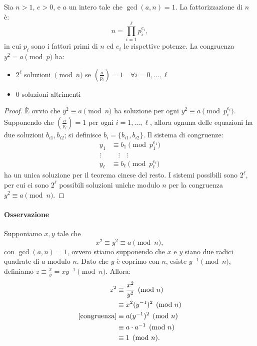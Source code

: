 \begin{theorem}
    \label{thm:4}
    Sia $n>1$, $e>0$, e $a$ un intero tale che $\gcd(a,n) = 1$. La fattorizzazione di $n$ è:
    \[
        n = \prod_{i=1}^{\ell} p_i^{e_i},
    \]
    in cui $p_i$ sono i fattori primi di $n$ ed $e_i$ le rispettive potenze. La congruenza $y^2 = a \pmod {p}$ ha:
    \begin{itemize}
        \item $2^{\ell}$ soluzioni $\pmod n$ se $\left( \frac{a}{p_i}\right) = 1 \quad \forall i=0,\dots,\ell$
        \item 0 soluzioni altrimenti
    \end{itemize}

\end{theorem}
\begin{proof}
    È ovvio che $y^2 \equiv a \pmod n$ ha soluzione per ogni $y^2 \equiv a \pmod {p_i^{e_i}}$. Supponendo che $\left(\frac{a}{p_i}\right) = 1$ per ogni $i = 1,\dots, \ell$, allora ognuna delle equazioni ha due soluzioni $b_{i1}, b_{i2}$; si definisce $b_i=\{b_{i1},b_{i2}\}$. Il sistema di congruenze:
    \begin{align*}
        {y_1} &\equiv b_1 \pmod {p_1^{e_1}}\\
        \vdots &\quad \vdots \quad \vdots\\
        {y_\ell} &\equiv b_\ell \pmod {p_\ell^{e_\ell}}
    \end{align*}
    ha un unica soluzione per il teorema cinese del resto. I sistemi possibili sono $2^{\ell}$, per cui ci sono $2^\ell$ possibili soluzioni uniche modulo $n$ per la congruenza $y^2 \equiv a \pmod n$.
    
\end{proof}

\paragraph{Osservazione} Supponiamo $x,y$ tale che
\begin{equation}
    \label{congruenza}
    x^2 \equiv y^2 \equiv a \pmod n,
\end{equation}
con $\gcd(a,n)=1$, ovvero stiamo supponendo che $x$ e $y$ siano due radici quadrate di $a$ modulo $n$. 
\noindent Dato che $y$ è coprimo con $n$, esiste $y^{-1} \pmod n$, definiamo $z \equiv \frac{x}{y} = xy^{-1} \pmod n$. Allora:
\[ 
\begin{aligned}
    z^2 &\equiv \frac{x^2}{y^2} \pmod n \\ 
    &\equiv x^2(y^{-1})^2 \pmod n   \\ 
    \substack{\ref{congruenza}} &\equiv a(y^{-1})^2 \pmod n \\  
    &\equiv a \cdot a^{-1} \pmod n \\
    &\equiv 1 \pmod n.
\end{aligned}
\]

